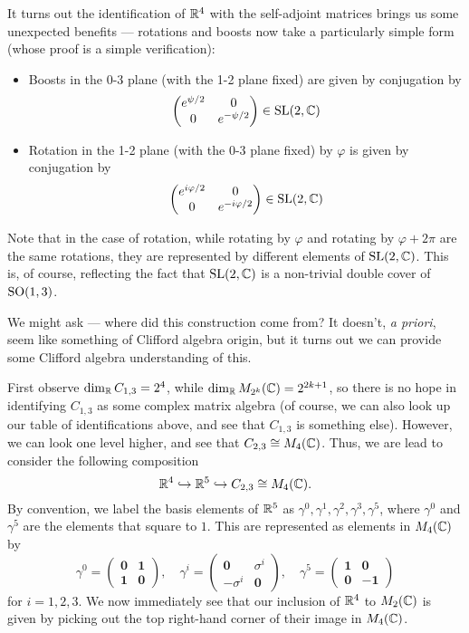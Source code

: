 \documentclass[a4paper]{article}
\begin{document}
It turns out the identification of $\mathbb{R}^4$ with the self-adjoint matrices brings us some unexpected benefits --- rotations and boosts now take a particularly simple form (whose proof is a simple verification):
\begin{prop}\leavevmode
  \begin{itemize}
    \item Boosts in the 0-3 plane (with the 1-2 plane fixed) are given by conjugation by
      \[
        \begin{pmatrix}
          e^{\psi/2} & 0\\
          0 & e^{-\psi/2}
        \end{pmatrix} \in \mathrm{SL}(2, \mathbb{C})
      \]
    \item Rotation in the 1-2 plane (with the 0-3 plane fixed) by $\varphi$ is given by conjugation by
      \[
        \begin{pmatrix}
          e^{i\varphi/2} & 0\\
          0 & e^{-i\varphi/2}
        \end{pmatrix} \in \mathrm{SL}(2, \mathbb{C})
      \]
  \end{itemize}
\end{prop}
Note that in the case of rotation, while rotating by $\varphi$ and rotating by $\varphi + 2\pi$ are the same rotations, they are represented by different elements of $\mathrm{SL}(2, \mathbb{C})$. This is, of course, reflecting the fact that $\mathrm{SL}(2, \mathbb{C})$ is a non-trivial double cover of $\mathrm{SO}(1, 3)$.

We might ask --- where did this construction come from? It doesn't, \emph{a priori}, seem like something of Clifford algebra origin, but it turns out we can provide some Clifford algebra understanding of this.

First observe $\dim_{\mathbb{R}} C_{1, 3} = 2^4$, while $\dim_{\mathbb{R}} M_{2^k}(\mathbb{C}) = 2^{2k + 1}$, so there is no hope in identifying $C_{1, 3}$ as some complex matrix algebra (of course, we can also look up our table of identifications above, and see that $C_{1, 3}$ is something else). However, we can look one level higher, and see that $C_{2, 3} \cong M_4(\mathbb{C})$. Thus, we are lead to consider the following composition
\[
  \mathbb{R}^4 \hookrightarrow \mathbb{R}^5 \hookrightarrow C_{2, 3} \cong M_4(\mathbb{C}).
\]
By convention, we label the basis elements of $\mathbb{R}^5$ as $\gamma^0, \gamma^1, \gamma^2, \gamma^3, \gamma^5$, where $\gamma^0$ and $\gamma^5$ are the elements that square to $1$. This are represented as elements in $M_4(\mathbb{C})$ by
\[
  \gamma^0 =
  \begin{pmatrix}
    \mathbf{0} & \mathbf{1}\\
    \mathbf{1} & \mathbf{0}
  \end{pmatrix},\quad
  \gamma^i =
  \begin{pmatrix}
    \mathbf{0} & \sigma^i\\
    -\sigma^i & \mathbf{0}
  \end{pmatrix},\quad
  \gamma^5 =
  \begin{pmatrix}
    \mathbf{1} & \mathbf{0}\\
    \mathbf{0} & -\mathbf{1}
  \end{pmatrix}
\]
for $i = 1, 2, 3$. We now immediately see that our inclusion of $\mathbb{R}^4$ to $M_2(\mathbb{C})$ is given by picking out the top right-hand corner of their image in $M_4(\mathbb{C})$.
\end{document}

